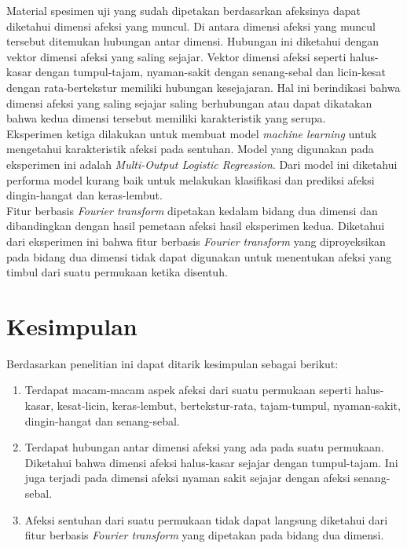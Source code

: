 \documentclass{Jurnal_kolo}
\begin{document}
\begin{multicols}{2}
	\indent Material spesimen uji yang sudah dipetakan berdasarkan afeksinya dapat diketahui dimensi afeksi yang muncul. Di antara dimensi afeksi yang muncul tersebut ditemukan hubungan antar dimensi. Hubungan ini diketahui dengan vektor dimensi afeksi yang saling sejajar. Vektor dimensi afeksi seperti halus-kasar dengan tumpul-tajam, nyaman-sakit dengan senang-sebal dan licin-kesat dengan rata-bertekstur memiliki hubungan kesejajaran. Hal ini berindikasi bahwa dimensi afeksi yang saling sejajar saling berhubungan atau dapat dikatakan bahwa kedua dimensi tersebut memiliki karakteristik yang serupa.\\
	\indent Eksperimen ketiga dilakukan untuk membuat model \emph{machine learning} untuk mengetahui karakteristik afeksi pada sentuhan. Model yang digunakan pada eksperimen ini adalah \emph{Multi-Output Logistic Regression}. Dari model ini diketahui performa model kurang baik untuk melakukan klasifikasi dan prediksi afeksi dingin-hangat dan keras-lembut.\\
	\indent Fitur berbasis \emph{Fourier transform} dipetakan kedalam bidang dua dimensi dan dibandingkan dengan hasil pemetaan afeksi hasil eksperimen kedua. Diketahui dari eksperimen ini bahwa fitur berbasis \emph{Fourier transform} yang diproyeksikan pada bidang dua dimensi tidak dapat digunakan untuk menentukan afeksi yang timbul dari suatu permukaan ketika disentuh.\\

	\section{Kesimpulan}
	\indent Berdasarkan penelitian ini dapat ditarik kesimpulan sebagai berikut:
	\begin{enumerate}
		\item Terdapat macam-macam aspek afeksi dari suatu permukaan seperti halus-kasar, kesat-licin, keras-lembut, bertekstur-rata, tajam-tumpul, nyaman-sakit, dingin-hangat dan senang-sebal.
		
		\item Terdapat hubungan antar dimensi afeksi yang ada pada suatu permukaan. Diketahui bahwa dimensi afeksi halus-kasar sejajar dengan tumpul-tajam. Ini juga terjadi pada dimensi afeksi nyaman sakit sejajar dengan afeksi senang-sebal.
		
		\item Afeksi sentuhan dari suatu permukaan tidak dapat langsung diketahui dari fitur berbasis \emph{Fourier transform} yang dipetakan pada bidang dua dimensi.
		

\end{enumerate}
\end{multicols}
\end{document}
